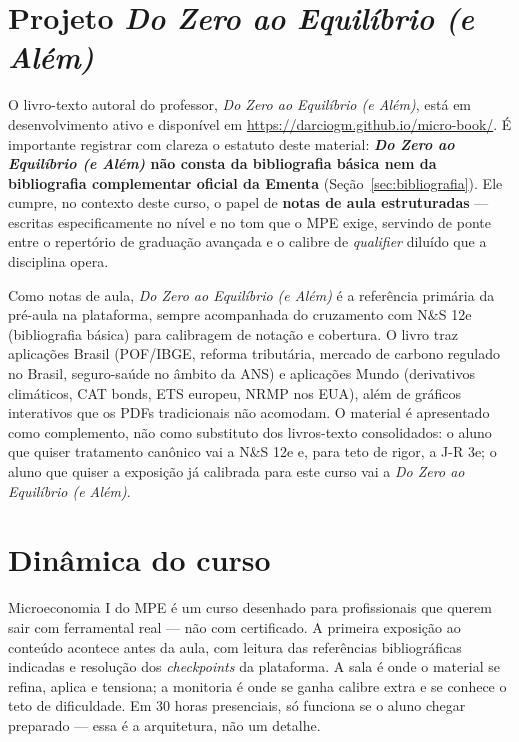 \documentclass[11pt,a4paper]{article}
\newcommand{\zae}{\textit{Do Zero ao Equilíbrio (e Além)}}
\newcommand{\ns}{N\&S 12e}
\newcommand{\jr}{J-R 3e}
\begin{document}
\section{Projeto \textit{Do Zero ao Equilíbrio (e Além)}}
\label{sec:zae}

O livro-texto autoral do professor, \zae{}, está em desenvolvimento ativo e disponível em \url{https://darciogm.github.io/micro-book/}. É importante registrar com clareza o estatuto deste material: \textbf{\zae{} não consta da bibliografia básica nem da bibliografia complementar oficial da Ementa} (Seção~\ref{sec:bibliografia}). Ele cumpre, no contexto deste curso, o papel de \textbf{notas de aula estruturadas} --- escritas especificamente no nível e no tom que o MPE exige, servindo de ponte entre o repertório de graduação avançada e o calibre de \textit{qualifier} diluído que a disciplina opera.

Como notas de aula, \zae{} é a referência primária da pré-aula na plataforma, sempre acompanhada do cruzamento com \ns{} (bibliografia básica) para calibragem de notação e cobertura. O livro traz aplicações Brasil (POF/IBGE, reforma tributária, mercado de carbono regulado no Brasil, seguro-saúde no âmbito da ANS) e aplicações Mundo (derivativos climáticos, CAT bonds, ETS europeu, NRMP nos EUA), além de gráficos interativos que os PDFs tradicionais não acomodam. O material é apresentado como complemento, não como substituto dos livros-texto consolidados: o aluno que quiser tratamento canônico vai a \ns{} e, para teto de rigor, a \jr{}; o aluno que quiser a exposição já calibrada para este curso vai a \zae{}.

\section{Dinâmica do curso}

Microeconomia I do MPE é um curso desenhado para profissionais que querem sair com ferramental real --- não com certificado. A primeira exposição ao conteúdo acontece antes da aula, com leitura das referências bibliográficas indicadas e resolução dos \textit{checkpoints} da plataforma. A sala é onde o material se refina, aplica e tensiona; a monitoria é onde se ganha calibre extra e se conhece o teto de dificuldade. Em 30 horas presenciais, só funciona se o aluno chegar preparado --- essa é a arquitetura, não um detalhe.
\end{document}
